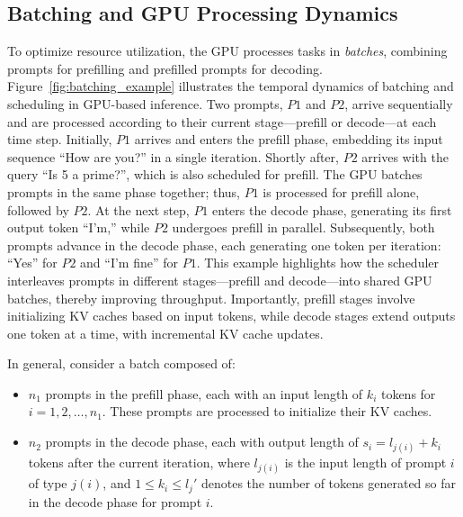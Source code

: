 
\subsection{Batching and GPU Processing Dynamics}
To optimize resource utilization, the GPU processes tasks in \textit{batches}, combining prompts for prefilling and prefilled prompts for decoding. Figure~\ref{fig:batching_example} illustrates the temporal dynamics of batching and scheduling in GPU-based inference. Two prompts, \( P1 \) and \( P2 \), arrive sequentially and are processed according to their current stage—prefill or decode—at each time step. Initially, \( P1 \) arrives and enters the prefill phase, embedding its input sequence ``How are you?'' in a single iteration. Shortly after, \( P2 \) arrives with the query ``Is 5 a prime?'', which is also scheduled for prefill. The GPU batches prompts in the same phase together; thus, \( P1 \) is processed for prefill alone, followed by \( P2 \). At the next step, \( P1 \) enters the decode phase, generating its first output token ``I'm,'' while \( P2 \) undergoes prefill in parallel. Subsequently, both prompts advance in the decode phase, each generating one token per iteration: ``Yes'' for \( P2 \) and ``I'm fine'' for \( P1 \). This example highlights how the scheduler interleaves prompts in different stages—prefill and decode—into shared GPU batches, thereby improving throughput. Importantly, prefill stages involve initializing KV caches based on input tokens, while decode stages extend outputs one token at a time, with incremental KV cache updates.


In general, consider a batch composed of:
\begin{itemize}
    \item \( n_1 \) prompts in the prefill phase, each with an input length of \( k_i \) tokens for \( i = 1, 2, \dots, n_1 \). These prompts are processed to initialize their KV caches.
    \item \( n_2 \) prompts in the decode phase, each with output length of \( s_i = l_{j(i)} + k_i \) tokens after the current iteration, where \( l_{j(i)} \) is the input length of prompt \( i \) of type \( j(i) \), and \(1\le k_i \le l_j'\) denotes the number of tokens generated so far in the decode phase for prompt \( i \).
\end{itemize}


